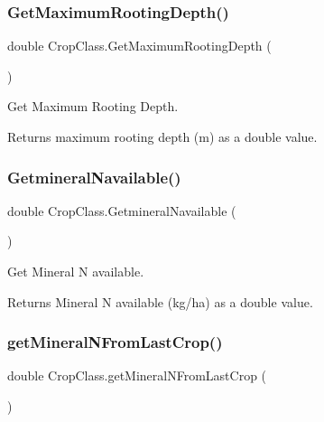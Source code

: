 \subsubsection{\texorpdfstring{GetMaximumRootingDepth()}{GetMaximumRootingDepth()}}
{\footnotesize\ttfamily double Crop\+Class.\+Get\+Maximum\+Rooting\+Depth (\begin{DoxyParamCaption}{ }\end{DoxyParamCaption})\hspace{0.3cm}{\ttfamily [inline]}}



Get Maximum Rooting Depth. 

\begin{DoxyReturn}{Returns}
maximum rooting depth (m) as a double value. 
\end{DoxyReturn}
\mbox{\label{class_crop_class_a436e6d75754c3cf937610a0b1cd337ea}} 
\subsubsection{\texorpdfstring{GetmineralNavailable()}{GetmineralNavailable()}}
{\footnotesize\ttfamily double Crop\+Class.\+Getmineral\+Navailable (\begin{DoxyParamCaption}{ }\end{DoxyParamCaption})\hspace{0.3cm}{\ttfamily [inline]}}



Get Mineral N available. 

\begin{DoxyReturn}{Returns}
Mineral N available (kg/ha) as a double value. 
\end{DoxyReturn}
\mbox{\label{class_crop_class_ab935be3bbe7d14e94d8be7446e2eec5c}} 
\subsubsection{\texorpdfstring{getMineralNFromLastCrop()}{getMineralNFromLastCrop()}}
{\footnotesize\ttfamily double Crop\+Class.\+get\+Mineral\+N\+From\+Last\+Crop (\begin{DoxyParamCaption}{ }\end{DoxyParamCaption})\hspace{0.3cm}{\ttfamily [inline]}}



